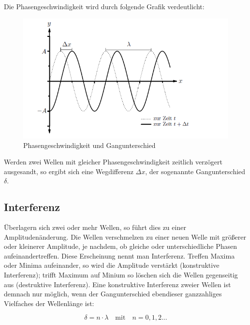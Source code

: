 \documentclass[12pt,a4paper,titlepage,headinclude,bibtotoc]{scrartcl}
\begin{document}
Die Phasengeschwindigkeit wird durch folgende Grafik verdeutlicht:

\begin{figure} [h]
\begin{center}
\includegraphics[scale=0.75]{Phasengeschwindigkeit2.png} \end{center}
\caption{Phasengeschwindigkeit und Gangunterschied}
\end{figure}

Werden zwei Wellen mit gleicher Phasengeschwindigkeit zeitlich verzögert ausgesandt, so ergibt sich eine Wegdifferenz $\Delta x$, der sogenannte Gangunterschied $\delta$. 

\subsection{Interferenz}
Überlagern sich zwei oder mehr Wellen, so führt dies zu einer Amplitudenänderung. Die Wellen verschmelzen zu einer neuen Welle mit größerer oder kleinerer Amplitude, je nachdem, ob gleiche oder unterschiedliche Phasen aufeinandertreffen. Diese Erscheinung nennt man Interferenz. Treffen Maxima oder Minima aufeinander, so wird die Amplitude verstärkt (konstruktive Interferenz); trifft Maximum auf Minium so löschen sich die Wellen gegenseitig aus (destruktive Interferenz). 
Eine konstruktive Interferenz zweier Wellen ist demnach nur möglich, wenn der Gangunterschied ebendieser ganzzahliges Vielfaches der Wellenlänge ist:\\
\par
\begin{equation}\delta={n}\cdot{\lambda} \quad \mathrm{mit} \quad n = 0,1,2...\end{equation}
\\
\par
\end{document}
